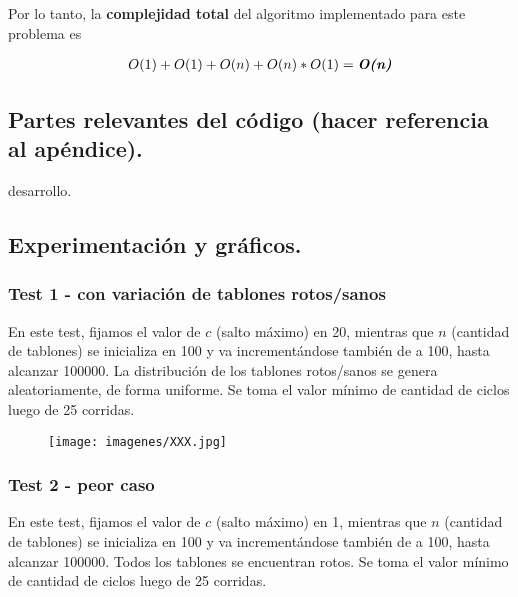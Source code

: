 Por lo tanto, la \textbf{complejidad total} del algoritmo implementado para este problema es

\begin{align*}
  O(1) + O(1) + O(n) + O(n)*O(1) = \textit{\textbf{O(n)}}
\end{align*}



\subsection{Partes relevantes del código (hacer referencia al apéndice).}

\vspace*{0.3cm}

desarrollo.



\subsection{Experimentación y gráficos.}

\vspace*{0.3cm}

\subsubsection{Test 1 - con variación de tablones rotos/sanos}

En este test, fijamos el valor de $c$ (salto máximo) en 20, mientras que $n$ (cantidad de tablones) 
se inicializa en 100 y va incrementándose también de a 100, hasta alcanzar 100000. La 
distribución de los tablones rotos/sanos se genera aleatoriamente, de forma uniforme. 
Se toma el valor mínimo de cantidad de ciclos luego de 25 corridas. 

\begin{figure}
  \begin{center}
    \texttt{[image: imagenes/XXX.jpg]}
  \end{center}
\end{figure}

\vspace*{0.5cm}


\subsubsection{Test 2 - peor caso}

En este test, fijamos el valor de $c$ (salto máximo) en 1, mientras que $n$ (cantidad de tablones) 
se inicializa en 100 y va incrementándose también de a 100, hasta alcanzar 100000. Todos los 
tablones se encuentran rotos. 
Se toma el valor mínimo de cantidad de ciclos luego de 25 corridas.

